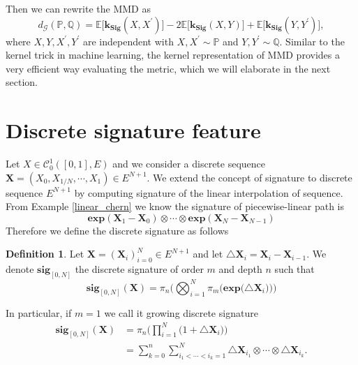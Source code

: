 \documentclass[12pt]{report}
\theoremstyle{definition}
\newtheorem{definition}[theorem]{Definition}
\theoremstyle{remark}
\newcommand{\E}{\mathbb{E}}
\renewcommand{\P}{\mathbb{P}}
\begin{document}
Then we can rewrite the MMD as 
\begin{equation}
   d_{\mathcal{G}}(\P,\mathbb{Q}) = \E\big[\mathbf{k_{Sig}}(X,X^{\prime})\big] - 2\E\big[\mathbf{k_{Sig}}(X,Y)\big] + \E\big[\mathbf{k_{Sig}}(Y,Y^{\prime})\big],
\end{equation}
where $X,Y,X^{\prime},Y^{\prime}$ are independent with $X,X^{\prime}\sim\P$ and $Y,Y^{\prime}\sim\mathbb{Q}$. Similar to the kernel trick in machine learning, the kernel representation of MMD provides a very efficient way evaluating the metric, which we will elaborate in the next section.  





\section{Discrete signature feature}
Let $X \in \mathcal{C}^{1}_{0}([0,1],E)$ and we consider a discrete sequence $\mathbf{X} = (X_{0},X_{1/N},\cdots, X_{1}) \in E^{N+1}$. We extend the concept of signature to discrete sequence $E^{N+1}$ by computing signature of the linear interpolation of sequence. From Example \ref{linear_chern} we know the signature of piecewise-linear path is 
\begin{equation}
  \mathbf{exp}(\mathbf{X}_{1} - \mathbf{X}_{0}) \otimes \cdots \otimes \mathbf{exp}(\mathbf{X}_{N} - \mathbf{X}_{N-1})
\end{equation}
Therefore we define the discrete signature as follows 
\begin{definition}
  Let $\mathbf{X} = (\mathbf{X}_{i})_{i=0}^{N} \in E^{N+1}$ and let $\triangle \mathbf{X}_{i} = \mathbf{X}_{i} - \mathbf{X}_{i-1}$. We denote $\mathbf{sig}_{[0,N]}$ the discrete signature of order $m$ and depth $n$ such that 
  \begin{equation}
    \mathbf{sig}_{[0,N]}(\mathbf{X}) = \pi_{n}\bigg(\bigotimes_{i=1}^{N}\pi_{m}\Big(\mathbf{exp}\big(\triangle \mathbf{X}_{i}\big)\Big)\bigg)
  \end{equation} 
\end{definition}
In particular, if $m = 1$ we call it growing discrete signature
  \begin{equation}
    \begin{split}
      \mathbf{sig}_{[0,N]}(\mathbf{X}) &= \pi_{n}\bigg(\prod_{i=1}^{N}\big(1 + \triangle \mathbf{X}_{i}\big)\bigg)\\
      &= \sum_{k=0}^{n}\sum_{i_{1} < \cdots < i_{k} = 1}^{N} \triangle \mathbf{X}_{i_{1}} \otimes \cdots \otimes \triangle \mathbf{X}_{i_{k}}.
    \end{split}
  \end{equation} 
\end{document}
